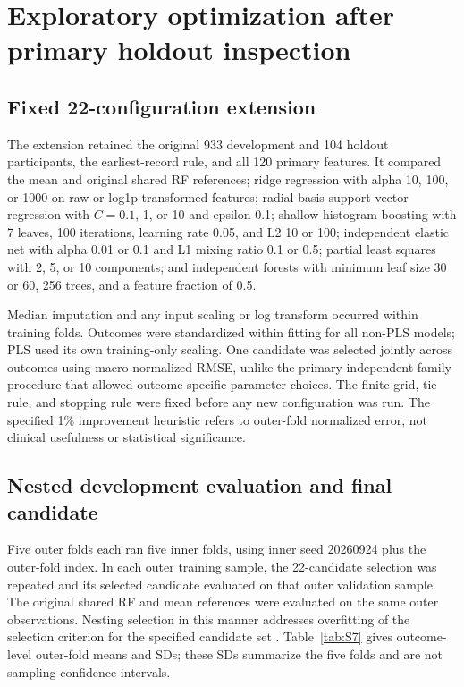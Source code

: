

\section{Exploratory optimization after primary holdout inspection}
\subsection{Fixed 22-configuration extension}
The extension retained the original 933 development and 104 holdout participants, the earliest-record rule, and all 120 primary features. It compared the mean and original shared RF references; ridge regression with alpha 10, 100, or 1000 on raw or log1p-transformed features; radial-basis support-vector regression with $C=0.1$, 1, or 10 and epsilon 0.1; shallow histogram boosting with 7 leaves, 100 iterations, learning rate 0.05, and L2 10 or 100; independent elastic net with alpha 0.01 or 0.1 and L1 mixing ratio 0.1 or 0.5; partial least squares with 2, 5, or 10 components; and independent forests with minimum leaf size 30 or 60, 256 trees, and a feature fraction of 0.5.

Median imputation and any input scaling or log transform occurred within training folds. Outcomes were standardized within fitting for all non-PLS models; PLS used its own training-only scaling. One candidate was selected jointly across outcomes using macro normalized RMSE, unlike the primary independent-family procedure that allowed outcome-specific parameter choices. The finite grid, tie rule, and stopping rule were fixed before any new configuration was run. The specified 1\% improvement heuristic refers to outer-fold normalized error, not clinical usefulness or statistical significance.

\subsection{Nested development evaluation and final candidate}
Five outer folds each ran five inner folds, using inner seed 20260924 plus the outer-fold index. In each outer training sample, the 22-candidate selection was repeated and its selected candidate evaluated on that outer validation sample. The original shared RF and mean references were evaluated on the same outer observations. Nesting selection in this manner addresses overfitting of the selection criterion for the specified candidate set \citep{cawley2010}. Table~\ref{tab:S7} gives outcome-level outer-fold means and SDs; these SDs summarize the five folds and are not sampling confidence intervals.

